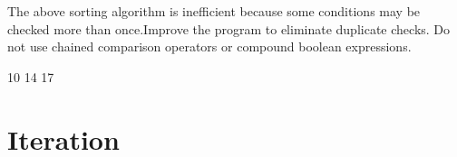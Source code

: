 \documentclass[letterpaper,10pt,english]{sphinxmanual}
\begin{document}
 The above sorting algorithm is inefficient because some conditions may be checked more than once.Improve the program to eliminate duplicate checks. Do not use chained comparison operators or compound boolean expressions.

\begin{sphinxVerbatim}[commandchars=\\\{\}]
   
       
           
              
           
              
              
       
          
       
          
          
        
\end{sphinxVerbatim}

\begin{sphinxVerbatim}[commandchars=\\\{\}]
10 14 17
\end{sphinxVerbatim}


\chapter{Iteration}
\label{\detokenize{Lecture3/Iteration:iteration}}\label{\detokenize{Lecture3/Iteration::doc}}
\end{document}
